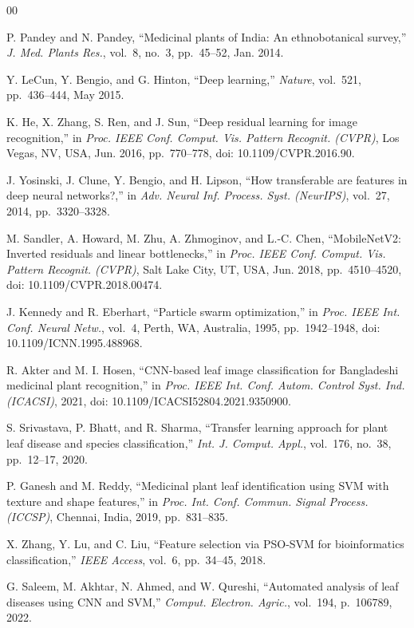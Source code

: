 \documentclass[conference]{IEEEtran}
\begin{document}
\begin{thebibliography}{00}

P. Pandey and N. Pandey,
``Medicinal plants of India: An ethnobotanical survey,''
\textit{J. Med. Plants Res.},
vol.~8, no.~3, pp.~45--52, Jan. 2014.

Y. LeCun, Y. Bengio, and G. Hinton,
``Deep learning,''
\textit{Nature},
vol.~521, pp.~436--444, May 2015.

K. He, X. Zhang, S. Ren, and J. Sun,
``Deep residual learning for image recognition,''
in \textit{Proc. IEEE Conf. Comput. Vis. Pattern Recognit. (CVPR)},
Los Vegas, NV, USA, Jun. 2016, pp.~770--778, doi: 10.1109/CVPR.2016.90.

J. Yosinski, J. Clune, Y. Bengio, and H. Lipson,
``How transferable are features in deep neural networks?,''
in \textit{Adv. Neural Inf. Process. Syst. (NeurIPS)},
vol.~27, 2014, pp.~3320--3328.

M. Sandler, A. Howard, M. Zhu, A. Zhmoginov, and L.-C. Chen,
``MobileNetV2: Inverted residuals and linear bottlenecks,''
in \textit{Proc. IEEE Conf. Comput. Vis. Pattern Recognit. (CVPR)},
Salt Lake City, UT, USA, Jun. 2018, pp.~4510--4520, doi: 10.1109/CVPR.2018.00474.

J. Kennedy and R. Eberhart,
``Particle swarm optimization,''
in \textit{Proc. IEEE Int. Conf. Neural Netw.},
vol.~4, Perth, WA, Australia, 1995, pp.~1942--1948, doi: 10.1109/ICNN.1995.488968.

R. Akter and M. I. Hosen,
``CNN-based leaf image classification for Bangladeshi medicinal plant recognition,''
in \textit{Proc. IEEE Int. Conf. Autom. Control Syst. Ind. (ICACSI)},
2021, doi: 10.1109/ICACSI52804.2021.9350900.

S. Srivastava, P. Bhatt, and R. Sharma,
``Transfer learning approach for plant leaf disease and species classification,''
\textit{Int. J. Comput. Appl.},
vol.~176, no.~38, pp.~12--17, 2020.

P. Ganesh and M. Reddy,
``Medicinal plant leaf identification using SVM with texture and shape features,''
in \textit{Proc. Int. Conf. Commun. Signal Process. (ICCSP)},
Chennai, India, 2019, pp.~831--835.

X. Zhang, Y. Lu, and C. Liu,
``Feature selection via PSO-SVM for bioinformatics classification,''
\textit{IEEE Access},
vol.~6, pp.~34--45, 2018.

G. Saleem, M. Akhtar, N. Ahmed, and W. Qureshi,
``Automated analysis of leaf diseases using CNN and SVM,''
\textit{Comput. Electron. Agric.},
vol.~194, p.~106789, 2022.

\end{thebibliography}
\end{document}
